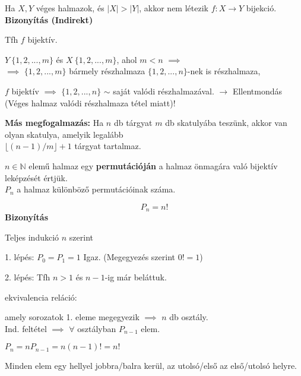 \begin{frame}
  \begin{tcolorbox}[title={Tétel: Skatulya-elv}]
    Ha $X, Y$ véges halmazok, és $|X| > |Y|$, akkor nem létezik $f: X \rightarrow Y$ bijekció.
  \tcblower
    \textbf{Bizonyítás (Indirekt)}
    \mmedskip
    
    Tfh $f$ bijektív.\\
    \msmallskip
    
    $Y ~ \{1, 2, ..., m\}$ és $X ~ \{1, 2, ..., m\}$, ahol $m < n$ $\implies$\\
    $\implies$ $\{1, 2, ..., m\}$ bármely részhalmaza $\{1, 2, ..., n\}$-nek is részhalmaza,\\
    \msmallskip
    
    $f$ bijektív $\implies$ $\{1, 2, ..., n\}$ $\sim$ saját valódi részhalmazával. $\rightarrow$ Ellentmondás (Véges halmaz valódi részhalmaza tétel miatt)!\\
    \bigskip

    \textbf{Más megfogalmazás:} Ha $n$ db tárgyat $m$ db skatulyába teszünk, akkor van olyan skatulya, amelyik legalább\\
    $\lfloor (n - 1) / m \rfloor + 1$ tárgyat tartalmaz.
  \end{tcolorbox}
\end{frame}

\begin{frame}
  \begin{tcolorbox}[title={Def.: Permutáció}]
    $n \in \mathbb{N}$ elemű halmaz egy \textbf{permutációján} a halmaz önmagára való bijektív leképzését értjük.\\
    $P_n$ a halmaz különböző permutációinak száma.
  \end{tcolorbox}

  \begin{tcolorbox}[title={Tétel: Permutációk száma}]
    $$P_n = n!$$
  \tcblower
    \textbf{Bizonyítás}
    \mmedskip
    
    Teljes indukció $n$ szerint\\
    \msmallskip
    
    1. lépés: $P_0 = P_1 = 1$ Igaz. (Megegyezés szerint $0! = 1$)\\
    \msmallskip
    
    2. lépés: Tfh $n > 1$ és $n - 1$-ig már beláttuk.\\
    \msmallskip
    
    ekvivalencia reláció:\\
    \mtinyskip
    
    amely sorozatok 1. eleme megegyezik $\implies$ $n$ db osztály.\\
    Ind. feltétel $\implies$ $\forall$ osztályban $P_{n - 1}$ elem.\\
    \msmallskip
    
    $P_n = nP_{n - 1} = n(n - 1)! = n!$
  \end{tcolorbox}

  \begin{tcolorbox}[title={Def.: Ciklikus permutáció}]
    Minden elem egy hellyel jobbra/balra kerül, az utolsó/első az első/utolsó helyre.
  \end{tcolorbox}
\end{frame}

